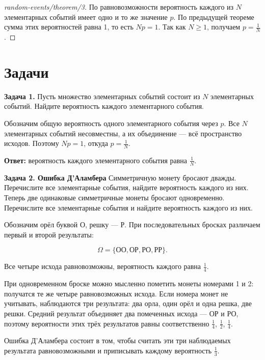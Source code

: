 \begin{proof}[random-events/theorem/3]\label{solution-random-events-theorem-3}
По равновозможности вероятность каждого из $N$ элементарных событий имеет одно и то же значение $p$. По предыдущей теореме сумма этих вероятностей равна 1, то есть $Np=1$. Так как $N\ge1$, получаем $p=\frac1N$.
\end{proof}

\section{Задачи}

\begin{task}\label{task-problems-1}
\textbf{Задача 1.} Пусть множество элементарных событий состоит из $N$ элементарных событий. Найдите вероятность каждого элементарного события.
\end{task}

\begin{solution}\label{solution-random-events-problems-1}
Обозначим общую вероятность одного элементарного события через $p$. Все $N$ элементарных событий несовместны, а их объединение — всё пространство исходов. Поэтому $Np=1$, откуда $p=\frac1N$.

\textbf{Ответ:} вероятность каждого элементарного события равна $\frac1N$.
\end{solution}

\begin{task}\label{task-problems-2}
\textbf{Задача 2. Ошибка Д'Аламбера} Симметричную монету бросают дважды. Перечислите все элементарные события, найдите вероятность каждого из них. Теперь две одинаковые симметричные монеты бросают одновременно. Перечислите все элементарные события и найдите вероятность каждого из них.
\end{task}

\begin{solution}\label{solution-random-events-problems-2}
Обозначим орёл буквой О, решку — Р. При последовательных бросках различаем первый и второй результаты:

\[\Omega=\{\text{ОО},\text{ОР},\text{РО},\text{РР}\}.\]

Все четыре исхода равновозможны, вероятность каждого равна $\frac14$.

При одновременном броске можно мысленно пометить монеты номерами 1 и 2: получатся те же четыре равновозможных исхода. Если номера монет не учитывать, наблюдаются три результата: два орла, один орёл и одна решка, две решки. Средний результат объединяет два помеченных исхода — ОР и РО, поэтому вероятности этих трёх результатов равны соответственно $\frac14$, $\frac12$, $\frac14$.

Ошибка Д'Аламбера состоит в том, чтобы считать эти три наблюдаемых результата равновозможными и приписывать каждому вероятность $\frac13$.
\end{solution}

